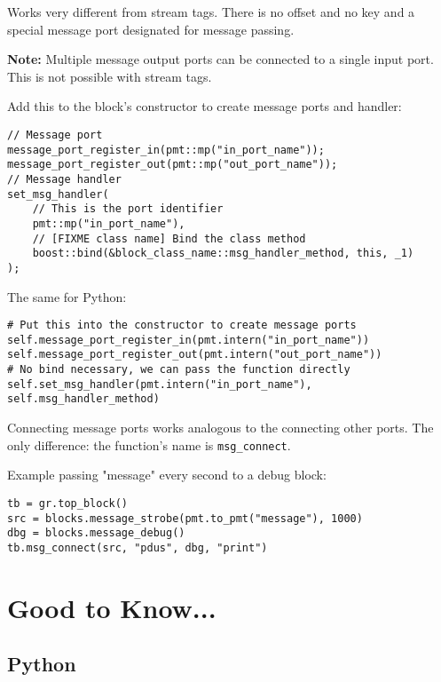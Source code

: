 \documentclass{article}
\begin{document}
\begin{description}[leftmargin=!, labelwidth=1in]
	
	\item[Msg Passing] Works very different from stream tags. There is no offset and no key and a special message port designated for message passing.
	
	\textbf{Note:} Multiple message output ports can be connected to a single input port. This is not possible with stream tags.
	
	\bigskip
	
	Add this to the block's constructor to create message ports and handler:
	
	\begin{verbatim}
// Message port
message_port_register_in(pmt::mp("in_port_name"));
message_port_register_out(pmt::mp("out_port_name"));
// Message handler
set_msg_handler(
	// This is the port identifier
	pmt::mp("in_port_name"), 
	// [FIXME class name] Bind the class method
	boost::bind(&block_class_name::msg_handler_method, this, _1)  
);
	\end{verbatim}
	
	The same for Python:
	\begin{verbatim}
# Put this into the constructor to create message ports
self.message_port_register_in(pmt.intern("in_port_name"))
self.message_port_register_out(pmt.intern("out_port_name"))
# No bind necessary, we can pass the function directly
self.set_msg_handler(pmt.intern("in_port_name"), self.msg_handler_method) 
	\end{verbatim}
	
	Connecting message ports works analogous to the connecting other ports. The only difference: the function's name is \texttt{msg\_connect}.
	
	\bigskip
	
	Example passing "message" every second to a debug block:
	
	\begin{verbatim}
tb = gr.top_block()
src = blocks.message_strobe(pmt.to_pmt("message"), 1000)
dbg = blocks.message_debug()
tb.msg_connect(src, "pdus", dbg, "print")
	\end{verbatim}
	
\end{description}

\section{Good to Know...}

\subsection{Python}
\end{document}
